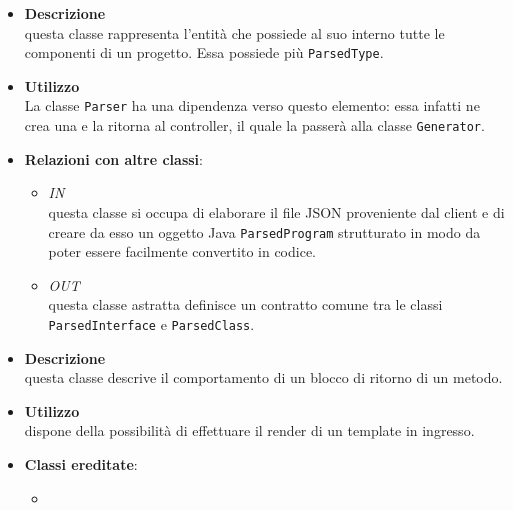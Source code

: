 \label{\nogloxy{swedesigner::server::project::ParsedProgram}}
\begin{itemize}
\item \textbf{Descrizione}\\
questa classe rappresenta l'entità che possiede al suo interno tutte le componenti di un progetto. Essa possiede più \texttt{ParsedType}.
\item \textbf{Utilizzo}\\
La classe \texttt{Parser} ha una dipendenza verso questo elemento: essa infatti ne crea una e la ritorna al controller, il quale la passerà alla classe \texttt{Generator}.
\item \textbf{Relazioni con altre classi}:
\begin{itemize}
\item \textit{IN} \hyperref[\nogloxy{swedesigner::server::parser::Parser}]{}\\
questa classe si occupa di elaborare il file JSON proveniente dal client e di creare da esso un oggetto Java \texttt{ParsedProgram} strutturato in modo da poter essere facilmente convertito in codice.
\item \textit{OUT} \hyperref[\nogloxy{swedesigner::server::project::ParsedType}]{}\\
questa classe astratta definisce un contratto comune tra le classi \texttt{ParsedInterface} e \texttt{ParsedClass}. 
\end{itemize}
\end{itemize}

\label{\nogloxy{swedesigner::server::project::ParsedReturn}}
\begin{itemize}
\item \textbf{Descrizione}\\
questa classe descrive il comportamento di un blocco di ritorno di un metodo.
\item \textbf{Utilizzo}\\
dispone della possibilità di effettuare il render di un template in ingresso.
\item \textbf{Classi ereditate}:
\begin{itemize}
\item \hyperref[\nogloxy{swedesigner::server::project::ParsedInstruction}]{}
\end{itemize}
\end{itemize}

